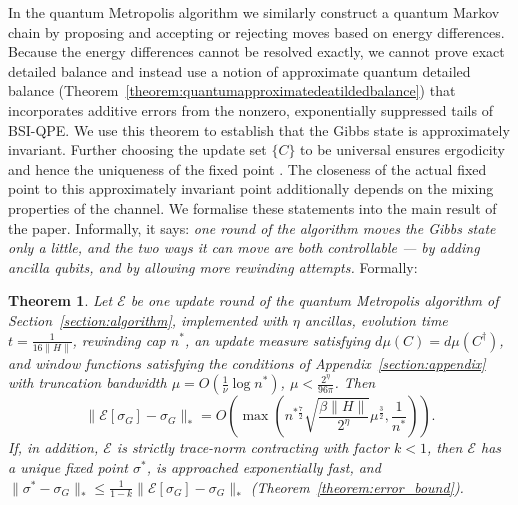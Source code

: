 \documentclass[aps,floatfix,10pt,amssymb,amsfont,amsmath,superscriptaddress,float,nofootinbib,longbibliography,nobalancelastpage,twocolumn]{revtex4-2}
\newtheorem{theorem}{Theorem}
\begin{document}
In the quantum Metropolis algorithm we similarly construct a quantum Markov chain by proposing and accepting or rejecting moves based on energy differences. Because the energy differences cannot be resolved exactly, we cannot prove exact detailed balance and instead use a notion of approximate quantum detailed balance (Theorem~\ref{theorem:quantumapproximatedeatildedbalance}) that incorporates additive errors from the nonzero, exponentially suppressed tails of BSI-QPE. We use this theorem to establish that the Gibbs state is approximately invariant. Further choosing the update set $\{C\}$ to be universal ensures ergodicity and hence the uniqueness of the fixed point \cite{Temme_2011}. The closeness of the actual fixed point to this approximately invariant point additionally depends on the mixing properties of the channel. We formalise these statements into the main result of the paper. Informally, it says: \emph{one round of the algorithm moves the Gibbs state only a little, and the two ways it can move are both controllable --- by adding ancilla qubits, and by allowing more rewinding attempts.} Formally:

\begin{theorem}
\label{theorem:main}
Let $\mathcal{E}$ be one update round of the quantum Metropolis algorithm of Section~\ref{section:algorithm}, implemented with $\eta$ ancillas, evolution time $t = \frac{1}{16\|H\|}$, rewinding cap $n^*$, an update measure satisfying $d\mu(C)=d\mu(C^{\dagger})$, and window functions satisfying the conditions of Appendix~\ref{section:appendix} with truncation bandwidth $\mu = O(\frac{1}{\nu}\log n^*)$, $\mu < \frac{2^{\eta}}{96\pi}$. Then
\begin{equation}
   \|\mathcal{E}[\sigma_G] - \sigma_G\|_* = O\left(\max\left( n^{*\frac{7}{2}}\sqrt{\frac{\beta\|H\| }{2^{\eta}}}\mu^{\frac{3}{2}},\frac{1}{n^*}\right)\right).
\label{eq:theoremmain}
\end{equation}
If, in addition, $\mathcal{E}$ is strictly trace-norm contracting with factor $k<1$, then $\mathcal{E}$ has a unique fixed point $\sigma^*$, is approached exponentially fast, and $\|\sigma^*-\sigma_G\|_* \leq \frac{1}{1-k}\|\mathcal{E}[\sigma_G] - \sigma_G\|_*$ (Theorem~\ref{theorem:error_bound}).
\end{theorem}
\end{document}

